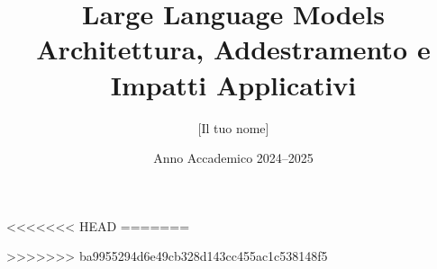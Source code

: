 \documentclass[a4paper,12pt]{article} %
\title{%
Large Language Models \\
\large Architettura, Addestramento e Impatti Applicativi
}
\author{[Il tuo nome]}
\date{Anno Accademico 2024--2025}
\begin{document}


\tableofcontents

\clearpage
{}









\appendix
<<<<<<< HEAD
=======

>>>>>>> ba9955294d6e49cb328d143cc455ac1c538148f5


% 
% 

\printbibliography
\end{document}
